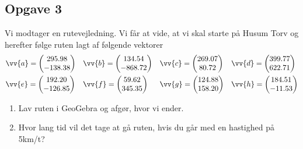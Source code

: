 \subsection*{Opgave 3}
Vi modtager en rutevejledning. Vi får at vide, at vi skal starte på Husum Torv og herefter følge ruten lagt af følgende vektorer
\begin{align*}
	&\vv{a} = \begin{pmatrix}
		295.98 \\
		-138.38
	\end{pmatrix}
	&
	&\vv{b} = \begin{pmatrix}
		134.54 \\
		-868.72
	\end{pmatrix}
	&
	&\vv{c} = \begin{pmatrix}
		269.07\\
		80.72
	\end{pmatrix}
	&
	&\vv{d} = \begin{pmatrix}
		399.77 \\
		622.71
	\end{pmatrix}
		\\
	&\vv{e} = \begin{pmatrix}
		192.20 \\
		-126.85
	\end{pmatrix}
	&
	&\vv{f} = \begin{pmatrix}
		59.62 \\
		345.35
	\end{pmatrix}
	&
	&\vv{g} = \begin{pmatrix}
		124.88 \\
		158.20
	\end{pmatrix}
	&
	&\vv{h} = \begin{pmatrix}
		184.51\\
		-11.53
	\end{pmatrix}
\end{align*}

\begin{enumerate}[label=\roman*)]
	\item Lav ruten i GeoGebra og afgør, hvor vi ender.
	\item Hvor lang tid vil det tage at gå ruten, hvis du går med en hastighed på 5km/t?
\end{enumerate}
